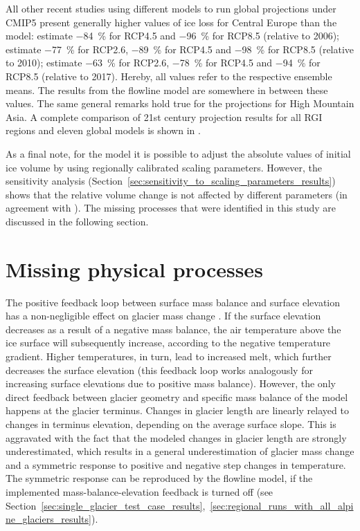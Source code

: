         All other recent studies using different models to run global projections under CMIP5 present generally higher values of ice loss for Central Europe than the \vas{} model:
        \citet{Radic2014a} estimate \SI{-84}{\percent} for RCP4.5 and \SI{-96}{\percent} for RCP8.5 (relative to 2006); \citet{Huss2015} estimate \SI{-77}{\percent} for RCP2.6, \SI{-89}{\percent} for RCP4.5 and \SI{-98}{\percent} for RCP8.5 (relative to 2010); \citet{Zekollari2019} estimate \SI{-63}{\percent} for RCP2.6, \SI{-78}{\percent} for RCP4.5 and \SI{-94}{\percent} for RCP8.5 (relative to 2017). Hereby, all values refer to the respective ensemble means. The results from the flowline model are somewhere in between these values. The same general remarks hold true for the projections for High Mountain Asia. A complete comparison of 21st century projection results for all RGI regions and eleven global models is shown in \citet[Figures S1--S20 in the supporting informations]{Marzeion2020}. 

        As a final note, for the \vas{} model it is possible to adjust the absolute values of initial ice volume by using regionally calibrated scaling parameters. However, the sensitivity analysis (Section~\ref{sec:sensitivity_to_scaling_parameters_results}) shows that the relative volume change is not affected by different parameters (in agreement with \citet{Radic2007, Radic2008}). The missing processes that were identified in this study are discussed in the following section.
    

    \section{Missing physical processes} %
    \label{sec:missing_physical_processes}
    
        The positive feedback loop between surface mass balance and surface elevation has a non-negligible effect on glacier mass change \citep{Huss2012a, Schafer2015}. If the surface elevation decreases as a result of a negative mass balance, the air temperature above the ice surface will subsequently increase, according to the negative temperature gradient. Higher temperatures, in turn, lead to increased melt, which further decreases the surface elevation (this feedback loop works analogously for increasing surface elevations due to positive mass balance). However, the only direct feedback between glacier geometry and specific mass balance of the \vas{} model happens at the glacier terminus.
        Changes in glacier length are linearly relayed to changes in terminus elevation, depending on the average surface slope. This is aggravated with the fact that the modeled changes in glacier length are strongly underestimated, which results in a general underestimation of glacier mass change and a symmetric response to positive and negative step changes in temperature. The symmetric response can be reproduced by the flowline model, if the implemented mass-balance-elevation feedback is turned off (see Section~\ref{sec:single_glacier_test_case_results},~\ref{sec:regional_runs_with_all_alpine_glaciers_results}).


